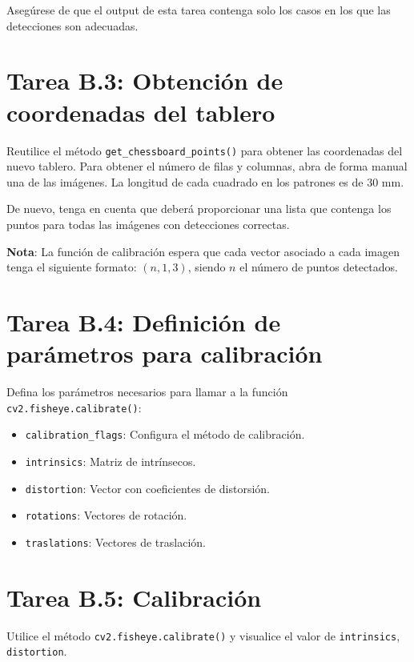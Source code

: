 Asegúrese de que el output de esta tarea contenga solo los casos en los que las detecciones son adecuadas.

\section*{Tarea B.3: Obtención de coordenadas del tablero}
Reutilice el método \texttt{get\_chessboard\_points()} para obtener las coordenadas del nuevo tablero. Para obtener el número de filas y columnas, abra de forma manual una de las imágenes. La longitud de cada cuadrado en los patrones es de 30 mm.

De nuevo, tenga en cuenta que deberá proporcionar una lista que contenga los puntos para todas las imágenes con detecciones correctas.

\textbf{Nota}: La función de calibración espera que cada vector asociado a cada imagen tenga el siguiente formato: $(n, 1, 3)$, siendo $n$ el número de puntos detectados.

\section*{Tarea B.4: Definición de parámetros para calibración}

Defina los parámetros necesarios para llamar a la función \texttt{cv2.fisheye.calibrate()}:

\begin{itemize}
    \item \texttt{calibration\_flags}: Configura el método de calibración.
    \item \texttt{intrinsics}: Matriz de intrínsecos.
    \item \texttt{distortion}: Vector con coeficientes de distorsión.
    \item \texttt{rotations}: Vectores de rotación.
    \item \texttt{traslations}: Vectores de traslación.
\end{itemize}


\section*{Tarea B.5: Calibración}

Utilice el método \texttt{cv2.fisheye.calibrate()} y visualice el valor de \texttt{intrinsics}, \texttt{distortion}.

